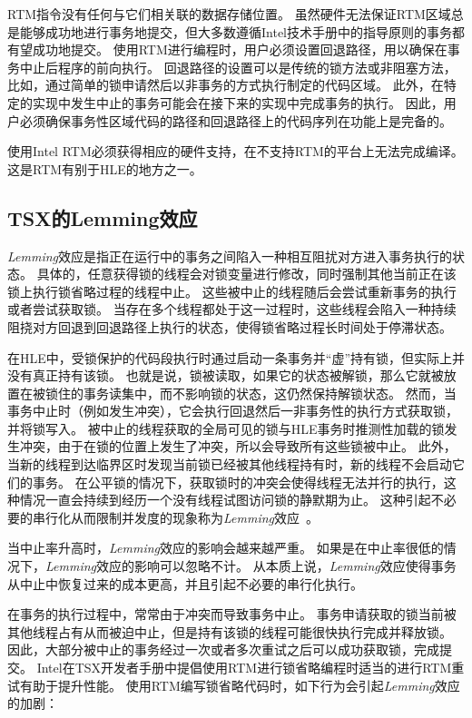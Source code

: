 RTM指令没有任何与它们相关联的数据存储位置。
虽然硬件无法保证RTM区域总是能够成功地进行事务地提交，但大多数遵循Intel技术手册中的指导原则的事务都有望成功地提交。
使用RTM进行编程时，用户必须设置回退路径，用以确保在事务中止后程序的前向执行。
回退路径的设置可以是传统的锁方法或非阻塞方法，比如，通过简单的锁申请然后以非事务的方式执行制定的代码区域。
此外，在特定的实现中发生中止的事务可能会在接下来的实现中完成事务的执行。
因此，用户必须确保事务性区域代码的路径和回退路径上的代码序列在功能上是完备的。

使用Intel RTM必须获得相应的硬件支持，在不支持RTM的平台上无法完成编译。
这是RTM有别于HLE的地方之一。

\subsection{TSX的Lemming效应}
\textit{Lemming}效应是指正在运行中的事务之间陷入一种相互阻扰对方进入事务执行的状态。
具体的，任意获得锁的线程会对锁变量进行修改，同时强制其他当前正在该锁上执行锁省略过程的线程中止。
这些被中止的线程随后会尝试重新事务的执行或者尝试获取锁。
当存在多个线程都处于这一过程时，这些线程会陷入一种持续阻挠对方回退到回退路径上执行的状态，使得锁省略过程长时间处于停滞状态。

在HLE中，受锁保护的代码段执行时通过启动一条事务并“虚”持有锁，但实际上并没有真正持有该锁。
也就是说，锁被读取，如果它的状态被解锁，那么它就被放置在被锁住的事务读集中，而不影响锁的状态，这仍然保持解锁状态。
然而，当事务中止时（例如发生冲突），它会执行回退然后一非事务性的执行方式获取锁，并将锁写入。
被中止的线程获取的全局可见的锁与HLE事务时推测性加载的锁发生冲突，由于在锁的位置上发生了冲突，所以会导致所有这些锁被中止。
此外，当新的线程到达临界区时发现当前锁已经被其他线程持有时，新的线程不会启动它们的事务。
在公平锁的情况下，获取锁时的冲突会使得线程无法并行的执行，这种情况一直会持续到经历一个没有线程试图访问锁的静默期为止。
这种引起不必要的串行化从而限制并发度的现象称为\textit{Lemming}效应~\cite{Dice2008Applications}。

当中止率升高时，\textit{Lemming}效应的影响会越来越严重。
如果是在中止率很低的情况下，\textit{Lemming}效应的影响可以忽略不计。
从本质上说，\textit{Lemming}效应使得事务从中止中恢复过来的成本更高，并且引起不必要的串行化执行。

在事务的执行过程中，常常由于冲突而导致事务中止。
事务申请获取的锁当前被其他线程占有从而被迫中止，但是持有该锁的线程可能很快执行完成并释放锁。
因此，大部分被中止的事务经过一次或者多次重试之后可以成功获取锁，完成提交。
Intel在TSX开发者手册中提倡使用RTM进行锁省略编程时适当的进行RTM重试有助于提升性能。
使用RTM编写锁省略代码时，如下行为会引起\textit{Lemming}效应的加剧：

